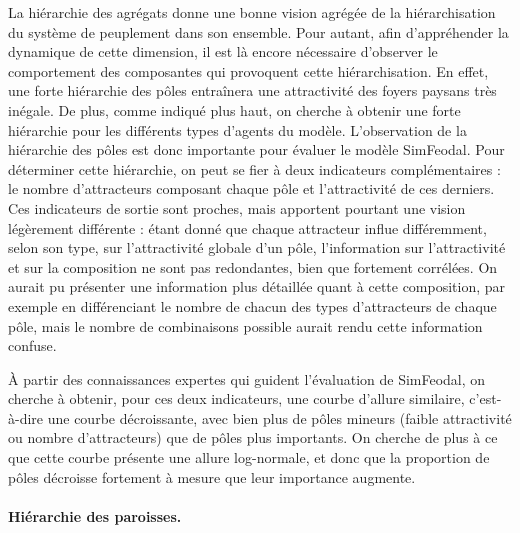 La hiérarchie des agrégats donne une bonne vision agrégée de la hiérarchisation du système de peuplement dans son ensemble.
Pour autant, afin d'appréhender la dynamique de cette dimension, il est là encore nécessaire d'observer le comportement des composantes qui provoquent cette hiérarchisation.
En effet, une forte hiérarchie des pôles entraînera une attractivité des foyers paysans très inégale.
De plus, comme indiqué plus haut, on cherche à obtenir une forte hiérarchie pour les différents types d'agents du modèle.
L'observation de la hiérarchie des pôles est donc importante pour évaluer le modèle SimFeodal.
Pour déterminer cette hiérarchie, on peut se fier à deux indicateurs complémentaires :
le nombre d'attracteurs composant chaque pôle et l'attractivité de ces derniers.
Ces indicateurs de sortie sont proches, mais apportent pourtant une vision légèrement différente :
étant donné que chaque attracteur influe différemment, selon son type, sur l'attractivité globale d'un pôle, l'information sur l'attractivité et sur la composition ne sont pas redondantes, bien que fortement corrélées.
On aurait pu présenter une information plus détaillée quant à cette composition, par exemple en différenciant le nombre de chacun des types d'attracteurs de chaque pôle, mais le nombre de combinaisons possible aurait rendu cette information confuse.

À partir des connaissances expertes qui guident l'évaluation de SimFeodal, on cherche à obtenir, pour ces deux indicateurs, une courbe d'allure similaire, c'est-à-dire une courbe décroissante, avec bien plus de pôles mineurs (faible attractivité ou nombre d'attracteurs) que de pôles plus importants.
On cherche de plus à ce que cette courbe présente une allure log-normale, et donc que la proportion de pôles décroisse fortement à mesure que leur importance augmente.

\paragraph{Hiérarchie des paroisses.}\label{par:hierarchie-paroisses}


